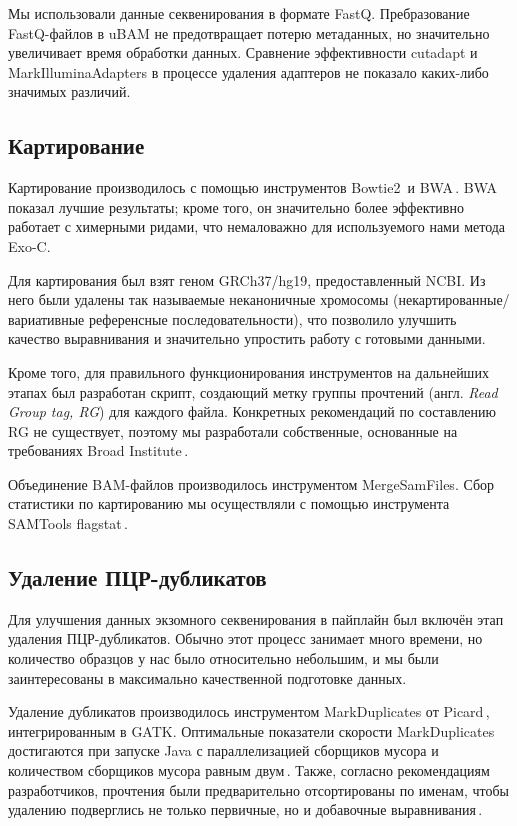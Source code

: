\documentclass[12pt, twoside, a4paper]{article}
\newcommand{\utilname}[1]{\textenglish{#1}}
\newcommand{\engterm}[1]{англ. \textenglish{\textit{#1}}}
\begin{document}
Мы использовали данные секвенирования в формате FastQ.
Пребразование FastQ-файлов в uBAM не предотвращает потерю метаданных, но значительно увеличивает время обработки данных.
Сравнение эффективности \utilname{cutadapt} и \utilname{MarkIlluminaAdapters} в процессе удаления адаптеров не показало каких-либо значимых различий.

\subsection{Картирование}
Картирование производилось с помощью инструментов \utilname{Bowtie2}\,\cite{Langmead_2012} и \utilname{BWA}\,\cite{Li_2009}.
\utilname{BWA} показал лучшие результаты;
кроме того, он значительно более эффективно работает с химерными ридами, что немаловажно для используемого нами метода Exo-C.

Для картирования был взят геном GRCh37/hg19, предоставленный NCBI.
Из него были удалены так называемые неканоничные хромосомы (некартированные/вариативные референсные последовательности), что позволило улучшить качество выравнивания и значительно упростить работу с готовыми данными.

Кроме того, для правильного функционирования инструментов на дальнейших этапах был разработан скрипт, создающий метку группы прочтений (\engterm{Read Group tag, RG}) для каждого файла.
Конкретных рекомендаций по составлению RG не существует, поэтому мы разработали собственные, основанные на требованиях Broad Institute\,\cite{Auwera_2013}.

Объединение BAM-файлов производилось инструментом \utilname{MergeSamFiles}.
Сбор статистики по картированию мы осуществляли с помощью инструмента \utilname{SAMTools flagstat}\,\cite{Li_2009_SAMTools}.

\subsection{Удаление ПЦР\hyp{}дубликатов}
Для улучшения данных экзомного секвенирования в пайплайн был включён этап удаления ПЦР\hyp{}дубликатов.
Обычно этот процесс занимает много времени, но количество образцов у нас было относительно небольшим, и мы были заинтересованы в максимально качественной подготовке данных.

Удаление дубликатов производилось инструментом \utilname{MarkDuplicates} от Picard\,\cite{PicardTools}, интегрированным в \utilname{GATK}.
Оптимальные показатели скорости \utilname{MarkDuplicates} достигаются при запуске \utilname{Java} с параллелизацией сборщиков мусора и количеством сборщиков мусора равным двум\,\cite{Heldenbrand_2019}.
Также, согласно рекомендациям разработчиков, прочтения были предварительно отсортированы по именам, чтобы удалению подверглись не только первичные, но и добавочные выравнивания\,\cite{Auwera_2013}.
\end{document}
